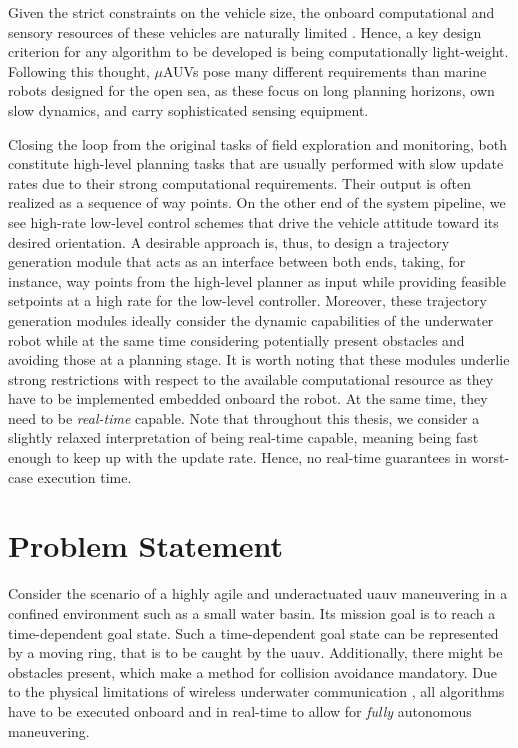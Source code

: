 Given the strict constraints on the vehicle size, the onboard computational and sensory resources of these vehicles are naturally limited \cite{Watson2020}.
Hence, a key design criterion for any algorithm to be developed is being computationally light-weight. 
Following this thought, $\mu$AUVs pose many different requirements than marine robots designed for the open sea, as these focus on long planning horizons, own slow dynamics, and carry sophisticated sensing equipment.

Closing the loop from the original tasks of field exploration and monitoring, both constitute high-level planning tasks that are usually performed with slow update rates due to their strong computational requirements.
Their output is often realized as a sequence of way points.
On the other end of the system pipeline, we see high-rate low-level control schemes that drive the vehicle attitude toward its desired orientation.
A desirable approach is, thus, to design a trajectory generation module that acts as an interface between both ends, taking, for instance, way points from the high-level planner as input while providing feasible setpoints at a high rate for the low-level controller. 
Moreover, these trajectory generation modules ideally consider the dynamic capabilities of the underwater robot while at the same time considering potentially present obstacles and avoiding those at a planning stage.
It is worth noting that these modules underlie strong restrictions with respect to the available computational resource as they have to be implemented embedded onboard the robot.
At the same time, they need to be \textit{real-time} capable. 
Note that throughout this thesis, we consider a slightly relaxed interpretation of being real-time capable, meaning being fast enough to keep up with the update rate. 
Hence, no real-time guarantees in worst-case execution time.





\section{Problem Statement}
Consider the scenario of a highly agile and underactuated \ac{uauv} maneuvering in a confined environment such as a small water basin.
Its mission goal is to reach a time-dependent goal state.
Such a time-dependent goal state can be represented by a moving ring, that is to be caught by the \ac{uauv}.
Additionally, there might be obstacles present, which make a method for collision avoidance mandatory.
Due to the physical limitations of wireless underwater communication \cite{Bettale08p1,GeistEtAl16}, all algorithms have to be executed onboard and in real-time to allow for \textit{fully} autonomous maneuvering.

